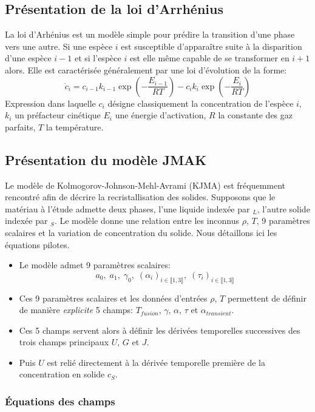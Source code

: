 \documentclass[10pt]{book}
\begin{document}
\subsection{Présentation de la loi d'Arrhénius}
La loi d'Arhénius est un modèle simple pour prédire la transition d'une phase vers une autre. Si une espèce $i$ est susceptible d’apparaître suite à la disparition d'une espèce $i-1$ et si l'espèce $i$ est elle même capable de se transformer en $i+1$ alors. Elle est caractérisée généralement par une loi d'évolution de la forme:
$$\dot{c}_{i}=c_{i-1}k_{i-1}\exp\left(-\dfrac{E_{i-1}}{RT}\right)-c_{i}k_{i}\exp\left(-\dfrac{E_{i}}{RT}\right)$$
Expression dans laquelle $c_{i}$ désigne classiquement la concentration de l'espèce $i$, $k_{i}$ un préfacteur cinétique $E_{i}$ une énergie d'activation, $R$ la constante des gaz parfaits, $T$ la température.

\subsection{Présentation du modèle JMAK}
Le modèle de Kolmogorov-Johnson-Mehl-Avrami (KJMA) est fréquemment rencontré afin de décrire la recristallisation des solides. Supposons que le matériau à l'étude admette deux phases, l'une liquide indexée par $_{L}$, l'autre solide indexée par $_{S}$. Le modèle donne une relation entre les inconnus $\rho$, $T$, 9 paramètres scalaires et la variation de concentration du solide. Nous détaillons ici les équations pilotes. 
\begin{itemize}[label=$\star$]
\item Le modèle admet 9 paramètres scalaires:
\begin{equation}
a_{0},\; a_{1},\; \gamma_{0},\; (\alpha_{i})_{i\in\llbracket 1,3\rrbracket},\; (\tau_{i})_{i\in\llbracket 1,3\rrbracket}
\label{eq:defi_9_param_scal}
\end{equation}
\item Ces 9 paramètres scalaires et les données d'entrées $\rho$, $T$ permettent de définir de manière \emph{explicite} 5 champs: $T_{fusion}$, $\gamma$, $\alpha$, $\tau$ et $\alpha_{transient}$.
\item Ces 5 champs servent alors à définir les dérivées temporelles successives  des trois champs principaux $U$, $G$ et $J$.
\item Puis $U$ est relié directement à la dérivée temporelle première de la concentration en solide $c_{S}$.
\end{itemize}
\subsubsection{Équations des champs}
\end{document}
